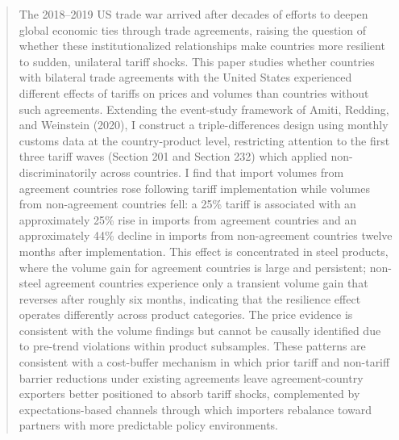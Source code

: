 \begin{abstract}
The 2018--2019 US trade war arrived after decades of efforts to deepen global economic ties through trade agreements, raising the question of whether these institutionalized relationships make countries more resilient to sudden, unilateral tariff shocks. This paper studies whether countries with bilateral trade agreements with the United States experienced different effects of tariffs on prices and volumes than countries without such agreements. Extending the event-study framework of Amiti, Redding, and Weinstein (2020), I construct a triple-differences design using monthly customs data at the country-product level, restricting attention to the first three tariff waves (Section 201 and Section 232) which applied non-discriminatorily across countries. I find that import volumes from agreement countries rose following tariff implementation while volumes from non-agreement countries fell: a 25\% tariff is associated with an approximately 25\% rise in imports from agreement countries and an approximately 44\% decline in imports from non-agreement countries twelve months after implementation. This effect is concentrated in steel products, where the volume gain for agreement countries is large and persistent; non-steel agreement countries experience only a transient volume gain that reverses after roughly six months, indicating that the resilience effect operates differently across product categories. The price evidence is consistent with the volume findings but cannot be causally identified due to pre-trend violations within product subsamples. These patterns are consistent with a cost-buffer mechanism in which prior tariff and non-tariff barrier reductions under existing agreements leave agreement-country exporters better positioned to absorb tariff shocks, complemented by expectations-based channels through which importers rebalance toward partners with more predictable policy environments.
\end{abstract}